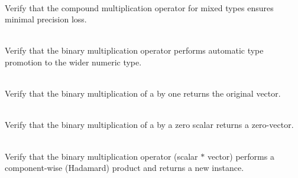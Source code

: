 \begin{DoxyRefList}
\item[{\parbox[t]{\linewidth}{Member \doxylink{group___f_g_m___vec4___multiplication_ga5fda3cce6e4b472c132be97ffbe3ed68}{Vector4\+DScalar\+Multiplication\+\_\+\+Mixed\+Type\+Scalar\+Multiplication\+Assignment\+Ensures\+Minimal\+Precision\+Loss} ()}}]\hfill \\
\label{test__test000032}%
%
Verify that the compound multiplication operator for mixed types ensures minimal precision loss.  
\item[{\parbox[t]{\linewidth}{Member \doxylink{group___f_g_m___vec4___multiplication_ga2b987b952d2c2d1c0c9fce1143189552}{Vector4\+DScalar\+Multiplication\+\_\+\+Mixed\+Type\+Scalar\+Multiplication\+Promotes\+Type} ()}}]\hfill \\
\label{test__test000030}%
%
Verify that the binary multiplication operator performs automatic type promotion to the wider numeric type.  
\item[{\parbox[t]{\linewidth}{Member \doxylink{group___f_g_m___vec4___multiplication_gab29546f90e3d310075c15befb02d71d3}{Vector4\+DScalar\+Multiplication\+\_\+\+Multiplication\+By\+One\+Returns\+Original\+Vector} ()}}]\hfill \\
\label{test__test000026}%
%
Verify that the binary multiplication of a  by one returns the original vector.  
\item[{\parbox[t]{\linewidth}{Member \doxylink{group___f_g_m___vec4___multiplication_ga5dc878b73d630c172ccf5377adcbc664}{Vector4\+DScalar\+Multiplication\+\_\+\+Multiplication\+By\+Zero\+Returns\+Zero\+Vector} ()}}]\hfill \\
\label{test__test000025}%
%
Verify that the binary multiplication of a  by a zero scalar returns a zero-\/vector.  
\item[{\parbox[t]{\linewidth}{Member \doxylink{group___f_g_m___vec4___multiplication_ga146296fc0db3b7a86835ae601ff1f0c7}{Vector4\+DScalar\+Multiplication\+\_\+\+Scalar\+Times\+AVector\+Returns\+Scaled\+Vector} ()}}]\hfill \\
\label{test__test000028}%
%
Verify that the binary multiplication operator (scalar \texorpdfstring{$\ast$}{*} vector) performs a component-\/wise (Hadamard) product and returns a new  instance.  
\item[{\parbox[t]{\linewidth}{Member \doxylink{group___f_g_m___vec4___multiplication_gaf8799c2258568f54625530e29a55aef5}{Vector4\+DScalar\+Multiplication\+\_\+\+Vector\+Times\+Equal\+Scalar\+Is\+The\+Same\+Vector\+Scaled} ()}}]\hfill \\

\end{DoxyRefList}
